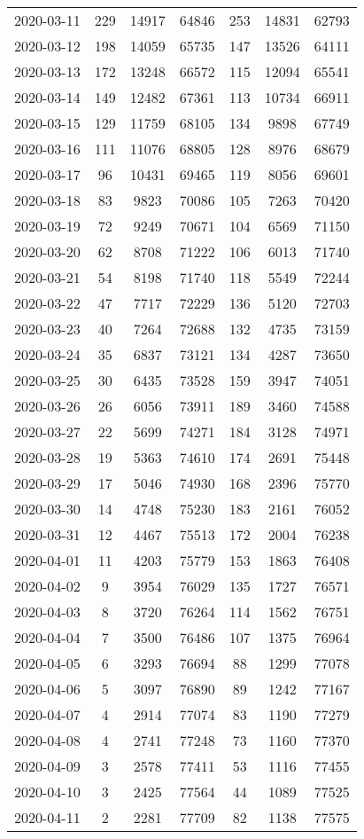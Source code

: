 \begin{longtable}{ccccccc}
2020-03-11&229&14917&64846&253&14831&62793\\
2020-03-12&198&14059&65735&147&13526&64111\\
2020-03-13&172&13248&66572&115&12094&65541\\
2020-03-14&149&12482&67361&113&10734&66911\\
2020-03-15&129&11759&68105&134&9898&67749\\
2020-03-16&111&11076&68805&128&8976&68679\\
2020-03-17&96&10431&69465&119&8056&69601\\
2020-03-18&83&9823&70086&105&7263&70420\\
2020-03-19&72&9249&70671&104&6569&71150\\
2020-03-20&62&8708&71222&106&6013&71740\\
2020-03-21&54&8198&71740&118&5549&72244\\
2020-03-22&47&7717&72229&136&5120&72703\\
2020-03-23&40&7264&72688&132&4735&73159\\
2020-03-24&35&6837&73121&134&4287&73650\\
2020-03-25&30&6435&73528&159&3947&74051\\
2020-03-26&26&6056&73911&189&3460&74588\\
2020-03-27&22&5699&74271&184&3128&74971\\
2020-03-28&19&5363&74610&174&2691&75448\\
2020-03-29&17&5046&74930&168&2396&75770\\
2020-03-30&14&4748&75230&183&2161&76052\\
2020-03-31&12&4467&75513&172&2004&76238\\
2020-04-01&11&4203&75779&153&1863&76408\\
2020-04-02&9&3954&76029&135&1727&76571\\
2020-04-03&8&3720&76264&114&1562&76751\\
2020-04-04&7&3500&76486&107&1375&76964\\
2020-04-05&6&3293&76694&88&1299&77078\\
2020-04-06&5&3097&76890&89&1242&77167\\
2020-04-07&4&2914&77074&83&1190&77279\\
2020-04-08&4&2741&77248&73&1160&77370\\
2020-04-09&3&2578&77411&53&1116&77455\\
2020-04-10&3&2425&77564&44&1089&77525\\
2020-04-11&2&2281&77709&82&1138&77575\\

\end{longtable}
